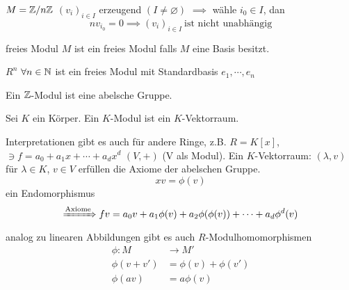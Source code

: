 \begin{Bsp}
  $M=\mathbb{Z}/n\mathbb{Z}$ $(v_i)_{i\in I}$ erzeugend $(I\neq \varnothing)$ $\implies$ wähle $i_0\in I$, dan 
  \[nv_{i_0}=0 \implies(v_i)_{i\in I}\ \text{ist nicht unabhängig}\]
\end{Bsp}
\begin{Def}{freies Modul}
  $M$ ist ein freies Modul falls $M$ eine Basis besitzt.
\end{Def}
\begin{Bsp}
  $R^n$ $\forall n\in \mathbb{N}$ ist ein freies Modul mit Standardbasis $e_1,\cdots,e_n$
\end{Bsp}
\begin{Bem}
  Ein $\mathbb{Z}$-Modul ist eine abelsche Gruppe.
\end{Bem}
\begin{Bem}
  Sei $K$ ein Körper. Ein $K$-Modul ist ein $K$-Vektorraum.
\end{Bem}
\begin{Bem}
  Interpretationen gibt es auch für andere Ringe, z.B. $R=K[x]$, $\ni f=a_0+a_1x+\cdots+a_dx^d$ $(V,+)$ (V als Modul). Ein $K$-Vektorraum: $(\lambda,v)$ für $\lambda\in K$, $v\in V$ erfüllen die Axiome der abelschen Gruppe.
  \[xv=\phi(v)\]
  ein Endomorphismus
  \[\xRightarrow{\text{Axiome}}fv=a_0v+a_1\phi(v)+a_2\phi(\phi(v))+\cdots+a_d\phi^d(v)\]
  analog zu linearen Abbildungen gibt es auch $R$-Modulhomomorphismen
  \begin{align*}
    \phi:M&\to M'\\
    \phi(v+v')&=\phi(v)+\phi(v')\\
    \phi(av)&=a\phi(v)
  \end{align*}
\end{Bem}
